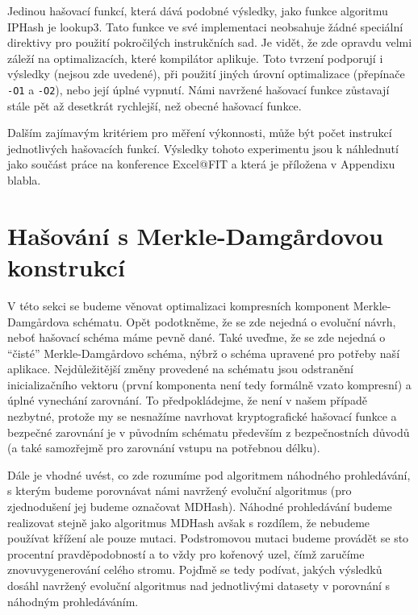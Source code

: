 Jedinou hašovací funkcí, která dává podobné výsledky, jako funkce algoritmu IPHash je lookup3. Tato funkce ve své
implementaci neobsahuje žádné speciální direktivy pro použití pokročilých instrukčních sad. Je vidět, že zde opravdu
velmi záleží na optimalizacích, které kompilátor aplikuje. Toto tvrzení podporují i výsledky (nejsou zde uvedené), při
použití jiných úrovní optimalizace (přepínače \texttt{-O1} a \texttt{-O2}), nebo její úplné vypnutí. Námi navržené hašovací
funkce zůstavají stále pět až desetkrát rychlejší, než obecné hašovací funkce. 

Dalším zajímavým kritériem pro měření výkonnosti, může být počet instrukcí jednotlivých hašovacích funkcí. Výsledky tohoto
experimentu jsou k náhlednutí jako součást práce na konference Excel@FIT a která je příložena v Appendixu blabla. 

\newpage
\section{Hašování s Merkle-Damg\r{a}rdovou konstrukcí}

V této sekci se budeme věnovat optimalizaci kompresních komponent Merkle-Damg\r{a}rdova schématu. Opět podotkněme,
že se zde nejedná o evoluční návrh, neboť hašovací schéma máme pevně dané. Také uveďme, že se zde nejedná o 
``čisté'' Merkle-Damg\r{a}rdovo schéma, nýbrž o schéma upravené pro potřeby naší aplikace. Nejdůležitější změny provedené
na schématu jsou odstranění inicializačního vektoru (první komponenta není tedy formálně vzato kompresní) a úplné 
vynechání zarovnání. To předpokládejme, že není v našem případě nezbytné, protože my se nesnažíme navrhovat 
kryptografické hašovací funkce a bezpečné zarovnání je v původním schématu především z bezpečnostních důvodů (a také
samozřejmě pro zarovnání vstupu na potřebnou délku).

Dále je vhodné uvést, co zde rozumíme pod algoritmem náhodného prohledávání, s kterým budeme porovnávat námi navržený
evoluční algoritmus (pro zjednodušení jej budeme označovat MDHash). Náhodné prohledávání budeme realizovat stejně jako
algoritmus MDHash avšak s rozdílem, že nebudeme používat křížení ale pouze mutaci. Podstromovou mutaci budeme provádět
se sto procentní pravděpodobností a to vždy pro kořenový uzel, čímž zaručíme znovuvygenerování celého stromu. Pojďmě se
tedy podívat, jakých výsledků dosáhl navržený evoluční algoritmus nad jednotlivými datasety v porovnání s náhodným
prohledáváním.  

